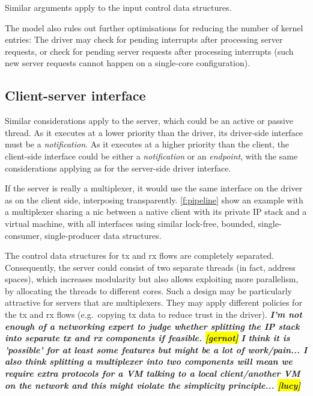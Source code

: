 \documentclass[a4paper,12pt]{report}
\newcommand{\Comment}[1]{\textbf{\textsl{#1}}}
\newcommand{\Comment}[1]{\relax}
\newcommand{\gernot}[1]{\Comment{#1 \colorbox{yellow}{[gernot]}}}
\newcommand{\lucy}[1]{\Comment{#1 \colorbox{yellow}{[lucy]}}}
\newcommand{\Obj}[1]{\textsl{#1}}
\begin{document}
Similar arguments apply to the input control data
structures.

The model also rules out further optimisations for reducing the number
of kernel entries: The driver may check for pending interrupts after
processing server requests, or check for pending server requests
after processing interrupts (such new server requests cannot happen on
a single-core configuration).
\fi

\iffalse
\subsection{Client-server interface}\label{s:sync_server}

Similar considerations apply to the server, which could be an active
or passive thread. As it executes at a lower
priority than the driver, its driver-side interface must be a
\Obj{notification}. As it executes at a higher priority than the client, the
client-side interface could be either a \Obj{notification} or an \Obj{endpoint},
with the same considerations applying as for the server-side driver
interface.

If the server is really a multiplexer, it would use the same interface
on the driver as on the client side, interposing
transparently. \autoref{f:pipeline} show an example with a multiplexer
sharing a \gls{nic} between a native client with its private IP stack and a
virtual machine, with all interfaces using similar lock-free, bounded,
single-consumer, single-producer data structures.

The control data structures for \gls{tx} and \gls{rx} flows are completely
separated. Consequently, the server could consist of two separate
threads (in fact, address spaces), which increases modularity but also
allows exploiting more parallelism, by allocating the threads to
different cores. Such a design may be particularly attractive for
servers that are multiplexers. They may apply different policies for
the \gls{tx} and \gls{rx} flows (e.g.\ copying \gls{tx} data to reduce trust in the
driver).
\iffalse
\gernot{I'm not enough of a networking
  expert to judge whether splitting the IP stack into separate \gls{tx} and
  \gls{rx} components if feasible.}
\lucy{I think it is 'possible' for at least some features but might be
  a lot of work/pain...
  I also think splitting a multiplexer into two components will mean we
  require extra protocols for a VM talking to a local client/another VM
  on the network and this might violate the simplicity principle... }
\end{document}
